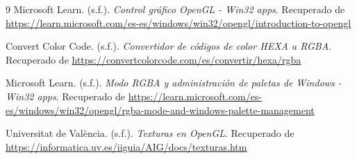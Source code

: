 \begin{thebibliography}{9}
  Microsoft Learn. (s.f.). \textit{Control gráfico OpenGL - Win32 apps}. Recuperado de \url{https://learn.microsoft.com/es-es/windows/win32/opengl/introduction-to-opengl}
  
Convert Color Code. (s.f.). \textit{Convertidor de códigos de color HEXA a RGBA}. Recuperado de \url{https://convertcolorcode.com/es/convertir/hexa/rgba}

Microsoft Learn. (s.f.). \textit{Modo RGBA y administración de paletas de Windows - Win32 apps}. Recuperado de \url{https://learn.microsoft.com/es-es/windows/win32/opengl/rgba-mode-and-windows-palette-management}

Universitat de València. (s.f.). \textit{Texturas en OpenGL}. Recuperado de \url{https://informatica.uv.es/iiguia/AIG/docs/texturas.htm}

\end{thebibliography}

